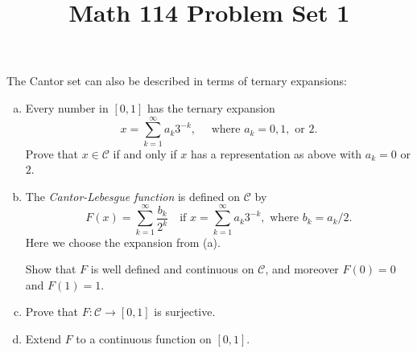 \documentclass[11pt,letterpaper]{article}
\title{\textbf{Math 114 Problem Set 1}}
\begin{document}
\maketitle

\begin{problem}
    The Cantor set can also be described in terms of ternary expansions:
    \begin{enumerate}[(a)]
        \item Every number in $[0,1]$ has the ternary expansion
        \[
            x = \sum^\infty_{k=1}a_k3^{-k}, \quad \textrm{ where } a_k=0,1,\textrm{ or }2
        .\] 
        Prove that $x\in \mathcal{C}$ if and only if $x$ has a representation as above with $a_k=0$ or $2$. 
        \item The \emph{Cantor-Lebesgue function} is defined on $\mathcal{C}$ by
        \[
            F(x)=\sum^\infty_{k=1}\frac{b_k}{2^k}\quad\textrm{if }x=\sum^\infty_{k=1}a_k3^{-k}, \textrm{ where }b_k=a_k /2
        .\] 
        Here we choose the expansion from (a).

        Show that $F$ is well defined and continuous on $\mathcal{C}$, and moreover $F(0)=0$ and $F(1)=1$.
        \item Prove that $F: \mathcal{C} \to [0,1]$ is surjective.
        \item Extend $F$ to a continuous function on $[0,1]$.
    \end{enumerate}
\end{problem}
\end{document}
